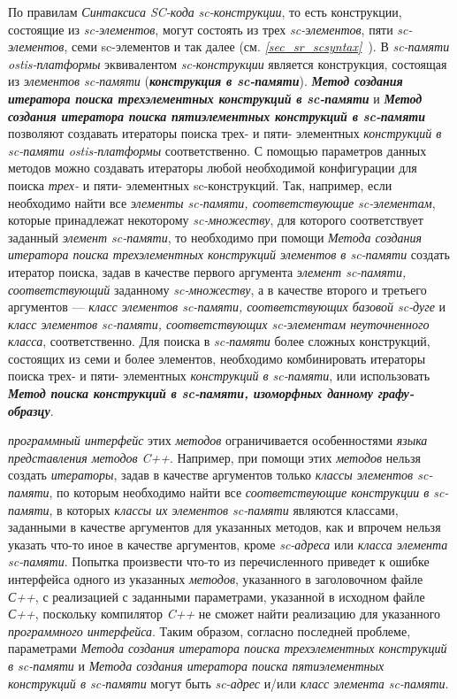 По правилам \textit{Синтаксиса SC-кода} \textit{sc-конструкции}, то есть конструкции, состоящие из \textit{sc-элементов}, могут состоять из трех \textit{sc-элементов}, пяти \textit{sc-элементов}, семи sc-элементов и так далее (см. \textit{\ref{sec_sr_scsyntax}~}). В \textit{sc-памяти ostis-платформы} эквивалентом \textit{sc-конструкции} является конструкция, состоящая из \textit{элементов sc-памяти} (\textbf{\textit{конструкция в sc-памяти}}). \textbf{\textit{Метод создания итератора поиска трехэлементных конструкций в sc-памяти}} и \textbf{\textit{Метод создания итератора поиска пятиэлементных конструкций в sc-памяти}} позволяют создавать итераторы поиска трех- и пяти- элементных \textit{конструкций в sc-памяти ostis-платформы} соответственно. С помощью параметров данных методов можно создавать итераторы любой необходимой конфигурации для поиска \textit{трех-} и {пяти- элементных sc-конструкций}. Так, например, если необходимо найти все \textit{элементы sc-памяти, соответствующие sc-элементам}, которые принадлежат некоторому \textit{sc-множеству}, для которого соответствует заданный \textit{элемент sc-памяти}, то необходимо при помощи \textit{Метода создания итератора поиска трехэлементных конструкций элементов в sc-памяти} создать итератор поиска, задав в качестве первого аргумента \textit{элемент sc-памяти, соответствующий} заданному \textit{sc-множеству}, а в качестве второго и третьего аргументов --- \textit{класс элементов sc-памяти, соответствующих базовой sc-дуге\scnsupergroupsign} и \textit{класс элементов sc-памяти, соответствующих sc-элементам неуточненного класса\scnsupergroupsign}, соответственно. Для поиска в \textit{sc-памяти} более сложных конструкций, состоящих из семи и более элементов, необходимо комбинировать итераторы поиска трех- и пяти- элементных \textit{конструкций в sc-памяти}, или использовать \textbf{\textit{Метод поиска конструкций в sc-памяти, изоморфных данному графу-образцу}}.

\textit{программный интерфейс} этих \textit{методов} ограничивается особенностями \textit{языка представления методов} \textit{C++}. Например, при помощи этих \textit{методов} нельзя создать \textit{итераторы}, задав в качестве аргументов только \textit{классы элементов sc-памяти\scnsupergroupsign}, по которым необходимо найти все \textit{соответствующие конструкции в sc-памяти}, в которых \textit{классы их элементов sc-памяти\scnsupergroupsign} являются классами, заданными в качестве аргументов для указанных методов, как и впрочем нельзя указать что-то иное в качестве аргументов, кроме \textit{sc-адреса} или \textit{класса элемента sc-памяти\scnsupergroupsign}. Попытка произвести что-то из перечисленного приведет к ошибке  интерфейса одного из указанных \textit{методов}, указанного в заголовочном файле \textit{С++}, с реализацией с заданными параметрами, указанной в исходном файле \textit{С++}, поскольку компилятор \textit{C++} не сможет найти реализацию для указанного \textit{программного интерфейса}. Таким образом, согласно последней проблеме, параметрами \textit{Метода создания итератора поиска трехэлементных конструкций в sc-памяти} и \textit{Метода создания итератора поиска пятиэлементных конструкций в sc-памяти} могут быть \textit{sc-адрес} и/или \textit{класс элемента sc-памяти\scnsupergroupsign}.

